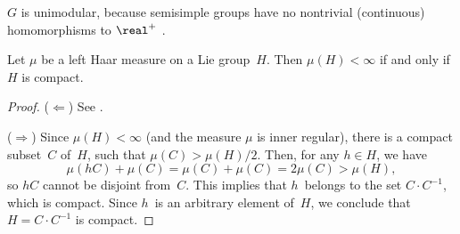\begin{rem} \label{SS->unimod}
 $G$ is unimodular, because semisimple groups have no nontrivial (continuous)
homomorphisms to $\real^+$ .
 \end{rem}

\begin{prop}
 Let $\mu$ be a left Haar measure on a Lie group~$H$. Then $\mu(H) < \infty$ if and only if $H$ is compact.
 \end{prop}

\begin{proof}
 ($\Leftarrow$) See .

($\Rightarrow$) Since $\mu(H) < \infty$ (and the measure $\mu$ is inner regular),
there is a compact subset~$C$ of~$H$, such that $\mu(C) > \mu(H)/2$. 
Then, for any $h \in H$, we have
	$$ \mu(hC) + \mu(C) = \mu(C) + \mu(C) = 2 \mu(C) > \mu(H) ,$$
so $hC$ cannot be disjoint from~$C$. This implies that $h$~belongs to the set $C \cdot C^{-1}$, which is compact. Since $h$~is an arbitrary element of~$H$, we conclude that $H = C \cdot C^{-1}$ is compact.
%
 \end{proof}

